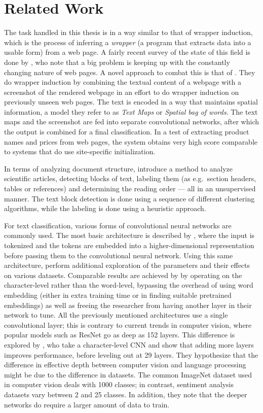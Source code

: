 \section{Related Work}
The task handled in this thesis is in a way similar to that of wrapper
induction, which is the process of inferring a \emph{wrapper} (a program that
extracts data into a usable form) from a web page. A fairly recent survey of the
state of this field is done by \textcite{wrapper}, who note that a big problem
is keeping up with the constantly changing nature of web pages.  A novel
approach to combat this is that of \textcite{deepweb}. They do wrapper induction
by combining the textual content of a webpage with a screenshot of the rendered
webpage in an effort to do wrapper induction on previously unseen web pages.
The text is encoded in a way that maintains spatial information, a model they
refer to as \emph{Text Maps} or \emph{Spatial bag of words}.  The text maps and
the screenshot are fed into separate convolutional networks, after which the
output is combined for a final classification. In a test of extracting product
names and prices from web pages, the system obtains very high score comparable
to systems that do use site-specific initialization.

In terms of analyzing document structure, \textcite{klampfl2014unsupervised}
introduce a method to analyze scientific articles, detecting blocks of text,
labeling them (as e.g.\ section headers, tables or references) and determining
the reading order --- all in an unsupervised manner. The text block detection is
done using a sequence of different clustering algorithms, while the labeling is
done using a heuristic approach.

For text classification, various forms of convolutional neural networks are
commonly used. The most basic architecture is described by
\textcite{kim2014conv}, where the input is tokenized and the tokens are embedded
into a higher-dimensional representation before
passing them to the convolutional neural network. Using this same architecture,
\textcite{zhang2015conv} perform additional exploration of the parameters and
their effects on various datasets. Comparable results are achieved by
\textcite{zhang2015character} by operating on the character-level rather than
the word-level, bypassing the overhead of using word embedding (either in extra
training time or in finding suitable pretrained embeddings) as well as freeing
the researcher from having another layer in their network to tune. All the
previously mentioned architectures use a single convolutional layer; this is
contrary to current trends in computer vision, where popular models such as
ResNet\citep{resnet2015} go as deep as 152 layers. This difference is explored
by \textcite{Conneau2016ldeep}, who take a character-level CNN and show that
adding more layers improves performance, before leveling out at 29 layers.  They
hypothesize that the difference in effective depth between computer vision and
language processing might be due to the difference in datasets. The common
ImageNet dataset used in computer vision deals with 1000 classes; in contrast,
sentiment analysis datasets vary between 2 and 25 classes. In addition, they
note that the deeper networks do require a larger amount of data to train.

